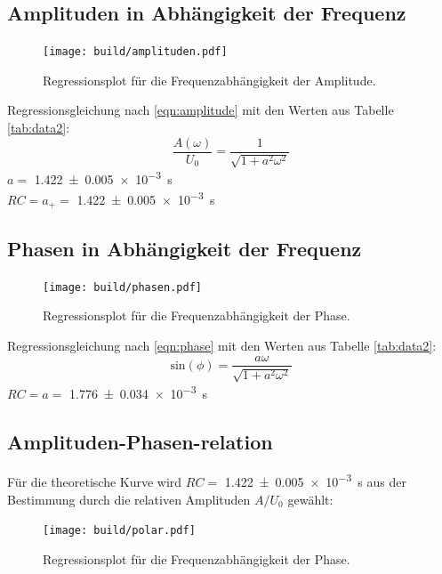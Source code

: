\subsection{Amplituden in Abhängigkeit der Frequenz}

\begin{figure}[H]
  \centering
  \texttt{[image: build/amplituden.pdf]}
  \caption{Regressionsplot für die Frequenzabhängigkeit der Amplitude.}
  \label{fig:amp_plot}
\end{figure}

Regressionsgleichung nach \eqref{eqn:amplitude}
mit den Werten aus Tabelle \ref{tab:data2}:
\begin{equation}
  \frac{A(\omega)}{U_0}=\frac{1}{\sqrt{1+a^2\omega^2}}
\end{equation}
$a=$ \pm\SI{1.422(5)e-3}{\second}\\
$RC=a_+=$ \SI{1.422(5)e-3}{\second}

\subsection{Phasen in Abhängigkeit der Frequenz}

\begin{figure}[H]
  \centering
  \texttt{[image: build/phasen.pdf]}
  \caption{Regressionsplot für die Frequenzabhängigkeit der Phase.}
  \label{fig:ph_plot}
\end{figure}

Regressionsgleichung nach \eqref{eqn:phase}
mit den Werten aus Tabelle \ref{tab:data2}:
\begin{equation}
  \text{sin}(\phi)=\frac{a\omega}{\sqrt{1+a^2\omega^2}}
\end{equation}
$RC=a=$ \SI{1.776(34)e-3}{\second}\\

\subsection{Amplituden-Phasen-relation}
Für die theoretische Kurve wird $RC=$ \SI{1.422(5)e-3}{\second} aus der Bestimmung durch die relativen
Amplituden $A/U_0$ gewählt:
\begin{figure}[H]
  \centering
  \texttt{[image: build/polar.pdf]}
  \caption{Regressionsplot für die Frequenzabhängigkeit der Phase.}
  \label{fig:pol_plot}
\end{figure}



